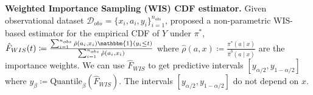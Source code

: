 \textbf{Weighted Importance Sampling (WIS) CDF estimator.} Given observational dataset $\mathcal{D}_{obs} = \{x_i, a_i, y_i\}_{i=1}^{n_{obs}}$, \cite{risk-assessment} proposed a non-parametric WIS-based estimator for the empirical CDF of $Y$ under $\pi^*$, 
$
\hat{F}_{WIS}(t) \coloneqq \frac{\sum_{i=1}^{n_{obs}} \hat{\rho}(a_i, x_i) \mathbbm{1}(y_i \leq t)}{\sum_{i=1}^{n_{obs}} \hat{\rho}(a_i, x_i)}
$
where $\hat{\rho}(a, x) \coloneqq \frac{\pi^*(a \mid x)}{\hat{\pi}^b(a \mid x)}$ are the importance weights. We can use $\hat{F}_{WIS}$ to get predictive intervals $[y_{\alpha/2}, y_{1-\alpha/2}]$ where $y_\beta \coloneqq \text{Quantile}_\beta(\hat{F}_{WIS})$. The intervals $[y_{\alpha/2}, y_{1-\alpha/2}]$ do not depend on $x$.




